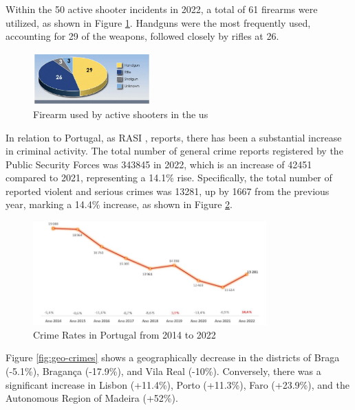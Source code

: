 Within the 50 active shooter incidents in 2022, a total of 61 firearms were utilized, as shown in Figure \ref{fig:fbi-firearms}. Handguns were the most frequently used, accounting for 29 of the weapons, followed closely by rifles at 26.

\begin{figure}[h]
    \centering 
    \includegraphics[width=0.4\textwidth]{figs/firearms.png} 
    \caption{Firearm used by active shooters in the \ac{us} \cite{rfc37}}
    \label{fig:fbi-firearms}
\end{figure}

In relation to Portugal, as RASI  \cite{rfc41}, reports, there has been a substantial 
increase in criminal activity. The total number of general crime reports registered 
by the Public Security Forces was 343845 in 2022, which is an increase of 42451 compared to 2021, 
representing a 14.1\% rise. Specifically, the total number of reported violent and serious crimes was 
13281, up by 1667 from the previous year, marking a 14.4\% increase, as shown in Figure \ref{fig:crimes-portugal}.

\begin{figure}[h]
    \centering 
    \includegraphics[width=0.8\textwidth]{figs/crimes-portugal.png} 
    \caption{Crime Rates in Portugal from 2014 to 2022 \cite{rfc41}}
    \label{fig:crimes-portugal}
\end{figure}

Figure \ref{fig:geo-crimes} shows a geographically decrease in the districts of Braga (-5.1\%), Bragança (-17.9\%), and Vila Real (-10\%). Conversely, there was a significant increase in Lisbon (+11.4\%), Porto (+11.3\%), Faro (+23.9\%), and the Autonomous Region of Madeira (+52\%).

